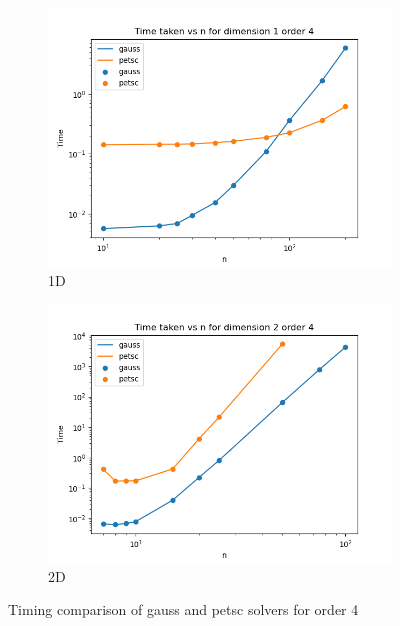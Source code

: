 \documentclass[12 pt, final]{article}
\begin{document}
\begin{itemize}
       \begin{figure}[H]
        \centering
        \begin{subfigure}{.5\textwidth}
          \centering
          \includegraphics[width=.99\linewidth]{figures/time_all_solvers_order_4_dimension_1.png}
          \caption{1D}
          \label{fig:sub1}
        \end{subfigure}%
        \begin{subfigure}{.5\textwidth}
          \centering
          \includegraphics[width=.99\linewidth]{figures/time_all_solvers_order_4_dimension_2.png}
          \caption{2D}
          \label{fig:sub2}
        \end{subfigure}
        \caption{Timing comparison of gauss and petsc solvers for order 4}
        \label{fig:test}
        \end{figure}


\end{itemize}
\end{document}
